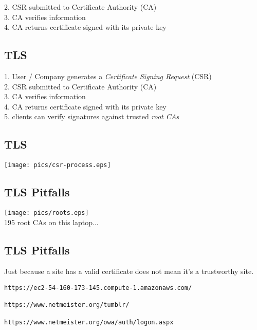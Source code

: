 \documentclass[xga]{xdvislides}
\begin{document}
2. CSR submitted to Certificate Authority (CA) \\

3. CA verifies information \\

4. CA returns certificate signed with its private key \\

\subsection{TLS}
1. User / Company generates a {\em Certificate Signing Request} (CSR) \\

2. CSR submitted to Certificate Authority (CA) \\

3. CA verifies information \\

4. CA returns certificate signed with its private key \\

5. clients can verify signatures against trusted {\em root CAs} \\

\subsection{TLS}
\begin{center}
	\texttt{[image: pics/csr-process.eps]}
\end{center}



\subsection{TLS Pitfalls}
\begin{center}
	\texttt{[image: pics/roots.eps]} \\
	195 root CAs on this laptop...
\end{center}

\subsection{TLS Pitfalls}
Just because a site has a valid certificate does not
mean it's a trustworthy site. \\

\begin{verbatim}
https://ec2-54-160-173-145.compute-1.amazonaws.com/

https://www.netmeister.org/tumblr/

https://www.netmeister.org/owa/auth/logon.aspx
\end{verbatim}
\end{document}
